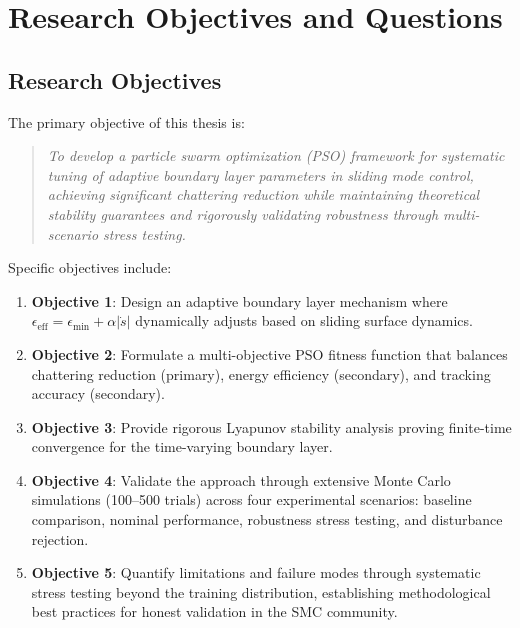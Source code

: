 \section{Research Objectives and Questions}
\label{sec:research_objectives}

\subsection{Research Objectives}

The primary objective of this thesis is:

\begin{quote}
\textit{To develop a particle swarm optimization (PSO) framework for systematic tuning of adaptive boundary layer parameters in sliding mode control, achieving significant chattering reduction while maintaining theoretical stability guarantees and rigorously validating robustness through multi-scenario stress testing.}
\end{quote}

\noindent Specific objectives include:

\begin{enumerate}
    \item \textbf{Objective 1}: Design an adaptive boundary layer mechanism where $\epsilon_{\text{eff}} = \epsilon_{\min} + \alpha|\dot{s}|$ dynamically adjusts based on sliding surface dynamics.

    \item \textbf{Objective 2}: Formulate a multi-objective PSO fitness function that balances chattering reduction (primary), energy efficiency (secondary), and tracking accuracy (secondary).

    \item \textbf{Objective 3}: Provide rigorous Lyapunov stability analysis proving finite-time convergence for the time-varying boundary layer.

    \item \textbf{Objective 4}: Validate the approach through extensive Monte Carlo simulations (100--500 trials) across four experimental scenarios: baseline comparison, nominal performance, robustness stress testing, and disturbance rejection.

    \item \textbf{Objective 5}: Quantify limitations and failure modes through systematic stress testing beyond the training distribution, establishing methodological best practices for honest validation in the SMC community.
\end{enumerate}

